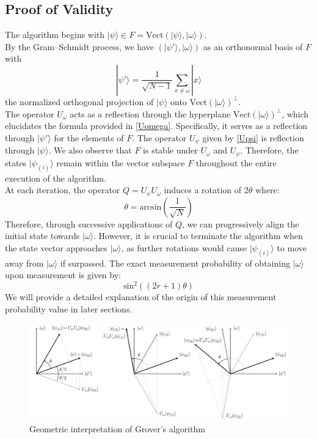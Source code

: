 
\subsection{Proof of Validity}

The algorithm begins with $|\psi \rangle \in F = \mathrm{Vect}(|\psi \rangle , |\omega \rangle )$. 
\\[5pt]
By the Gram–Schmidt process, we have $(|\psi' \rangle, | \omega \rangle)$ as an orthonormal basis of $F$ with 
\[|\psi'\rangle = \frac{1}{\sqrt{N-1}}\sum_{x \neq \omega} |x \rangle\]
the normalized orthogonal projection of $|\psi \rangle$ onto $\mathrm{Vect}(|\omega \rangle )^{\perp}$. 
\\[5pt]
The operator $U_{\omega}$ acts as a reflection through the hyperplane $\mathrm{Vect}(|\omega \rangle)^{\perp}$, which elucidates the formula provided in \eqref{Uomega}. Specifically, it serves as a reflection through  $|\psi'\rangle$ for the elements of $F$.
The operator $U_{\psi}$ given by \eqref{Upsi} is reflection through $|\psi\rangle$.
We also observe that $F$ is stable under $U_{\omega}$ and $U_{\psi}$. Therefore, the states $|\psi_{(i)} \rangle$ remain within the vector subspace $F$ throughout the entire execution of the algorithm.
\\[5pt]
At each iteration, the operator $Q=U_{\psi} U_{\omega}$ induces a rotation of $2\theta$ where:
\[\theta = \mathrm{arcsin}(\frac{1}{\sqrt{N}})\]
Therefore, through successive applications of $Q$, we can progressively align the initial state towards $|\omega \rangle$.
However, it is crucial to terminate the algorithm when the state vector approaches $|\omega \rangle$, as further rotations would cause $|\psi_{(i)} \rangle$ to move away from $|\omega \rangle$ if surpassed.
The exact measurement probability of obtaining $|\omega\rangle$ upon measurement is given by:
\[\mathrm{sin}^2 \left( \left( 2r + 1 \right) \theta \right) \]
We will provide a detailed explanation of the origin of this measurement probability value in later sections.
\begin{figure}
\hspace{1.2cm}
\begin{adjustbox}{minipage=1.2\textwidth, right}
\includegraphics[scale=0.3]{GroverGeom.png}
\end{adjustbox}
\caption{Geometric interpretation of Grover's algorithm}
\label{fig:grover}
\end{figure}
